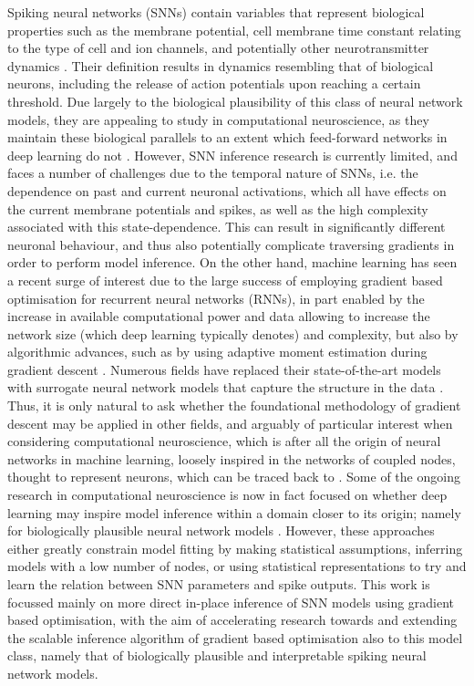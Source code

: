 \documentclass[mphil,deptreport,ianc]{infthesis} %
\begin{document}
Spiking neural networks (SNNs) contain variables that represent biological properties such as the membrane potential, cell membrane time constant relating to the type of cell and ion channels, and potentially other neurotransmitter dynamics \cite{Johnson2017}.
Their definition results in dynamics resembling that of biological neurons, including the release of action potentials upon reaching a certain threshold.
Due largely to the biological plausibility of this class of neural network models, they are appealing to study in computational neuroscience, as they maintain these biological parallels to an extent which feed-forward networks in deep learning do not \cite{Wu2018, Taherkhani2018, Taherkhani2020}.
However, SNN inference research is currently limited, and faces a number of challenges due to the temporal nature of SNNs, i.e. the dependence on past and current neuronal activations, which all have effects on the current membrane potentials and spikes, as well as the high complexity associated with this state-dependence. 
This can result in significantly different neuronal behaviour, and thus also potentially complicate traversing gradients in order to perform model inference.
On the other hand, machine learning has seen a recent surge of interest due to the large success of employing gradient based optimisation for recurrent neural networks (RNNs), in part enabled by the increase in available computational power and data allowing to increase the network size (which deep learning typically denotes) and complexity, but also by algorithmic advances, such as by using adaptive moment estimation during gradient descent \cite{Schmidhuber2014, Bengio2011}.
Numerous fields have replaced their state-of-the-art models with surrogate neural network models that capture the structure in the data \cite{Lueckmann2018, Lueckmann2021, Tejero-Cantero2020, Cranmer2020, Greenberg}.
Thus, it is only natural to ask whether the foundational methodology of gradient descent may be applied in other fields, and arguably of particular interest when considering computational neuroscience, which is after all the origin of neural networks in machine learning, loosely inspired in the networks of coupled nodes, thought to represent neurons, which can be traced back to \cite{McCulloch1943}.
Some of the ongoing research in computational neuroscience is now in fact focused on whether deep learning may inspire model inference within a domain closer to its origin; namely for biologically plausible neural network models \cite{GrunSonjaRotter2010, Schwalger2017, Taherkhani2020}.
However, these approaches either greatly constrain model fitting by making statistical assumptions, inferring models with a low number of nodes, or using statistical representations to try and learn the relation between SNN parameters and spike outputs.
This work is focussed mainly on more direct in-place inference of SNN models using gradient based optimisation, with the aim of accelerating research towards and extending the scalable inference algorithm of gradient based optimisation also to this model class, namely that of biologically plausible and interpretable spiking neural network models.
\end{document}
